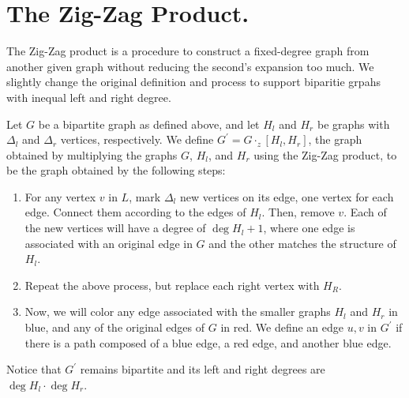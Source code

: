 \section{The Zig-Zag Product.}
The Zig-Zag product is a procedure to construct a fixed-degree graph from another given graph without reducing the second's expansion too much. We slightly change the original definition and process to support biparitie grpahs with inequal left and right degree. 
\begin{definition}
  Let $G$ be a bipartite graph as defined above, and let $H_{l}$ and $H_{r}$ be graphs with $\Delta_{l}$ and $\Delta_{r}$ vertices, respectively. We define $G^{\prime} = G \cdot_{z} [H_{l},H_{r}]$, the graph obtained by multiplying the graphs $G$, $H_{l}$, and $H_{r}$ using the Zig-Zag product, to be the graph obtained by the following steps:
  \begin{enumerate}
    \item For any vertex $v$ in $L$, mark $\Delta_{l}$ new vertices on its edge, one vertex for each edge. Connect them according to the edges of $H_{l}$. Then, remove $v$. Each of the new vertices will have a degree of $\deg H_{l} + 1$, where one edge is associated with an original edge in $G$ and the other matches the structure of $H_{l}$.
    \item Repeat the above process, but replace each right vertex with $H_{R}$.
    \item Now, we will color any edge associated with the smaller graphs $H_{l}$ and $H_{r}$ in blue, and any of the original edges of $G$ in red. We define an edge ${u,v}$ in $G^{\prime}$ if there is a path composed of a blue edge, a red edge, and another blue edge.
  \end{enumerate}
  Notice that $G^\prime$ remains bipartite and its left and right degrees are $\deg H_{l} \cdot \deg H_{r}$.
\end{definition}

